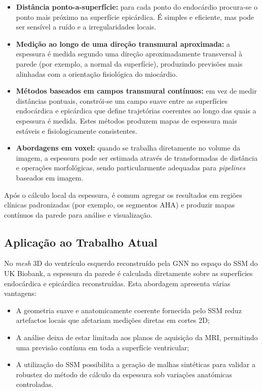 \documentclass[12pt,a4paper]{report}
\begin{document}
\begin{itemize}
    \item \textbf{Distância ponto-a-superfície:} para cada ponto do endocárdio procura-se o ponto mais próximo na superfície epicárdica. É simples e eficiente, mas pode ser sensível a ruído e a irregularidades locais. \parencite{prasad-2009}
    
    \item \textbf{Medição ao longo de uma direção transmural aproximada:} a espessura é medida segundo uma direção aproximadamente transversal à parede (por exemplo, a normal da superfície), produzindo previsões mais alinhadas com a orientação fisiológica do miocárdio. \parencite{lopez-perez-2015,roohi-2012}
    
    \item \textbf{Métodos baseados em campos transmural contínuos:} em vez de medir distâncias pontuais, constrói-se um campo suave entre as superfícies endocárdica e epicárdica que define trajetórias coerentes ao longo das quais a espessura é medida. Estes métodos produzem mapas de espessura mais estáveis e fisiologicamente consistentes. \parencite{mahmoudzadeh-2013,lopez-perez-2015}
    
    \item \textbf{Abordagens em voxel:} quando se trabalha diretamente no volume da imagem, a espessura pode ser estimada através de transformadas de distância e operações morfológicas, sendo particularmente adequadas para \textit{pipelines} baseados em imagem. \parencite{mahmoudzadeh-2013}
\end{itemize}

Após o cálculo local da espessura, é comum agregar os resultados em regiões clínicas padronizadas (por exemplo, os segmentos AHA) e produzir mapas contínuos da parede para análise e visualização. \parencite{prasad-2009}

\subsection*{Aplicação ao Trabalho Atual}
No \textit{mesh} 3D do ventrículo esquerdo reconstruído pela GNN no espaço do SSM do UK Biobank, a espessura da parede é calculada diretamente sobre as superfícies endocárdica e epicárdica reconstruídas. Esta abordagem apresenta várias vantagens:

\begin{itemize}
    \item A geometria suave e anatomicamente coerente fornecida pelo SSM reduz artefactos locais que afetariam medições diretas em cortes 2D;
    \item A análise deixa de estar limitada aos planos de aquisição da MRI, permitindo uma previsão contínua em toda a superfície ventricular;
    \item A utilização do SSM possibilita a geração de malhas sintéticas para validar a robustez do método de cálculo da espessura sob variações anatómicas controladas.
\end{itemize}
\end{document}
